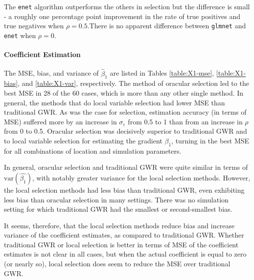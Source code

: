 \documentclass[authoryear, review, 11pt]{elsarticle}
\begin{document}
	The \verb!enet! algorithm outperforms the others in selection but the difference is small - a roughly one percentage point improvement in the rate of true positives and true negatives when $\rho = 0.5$.There is no apparent difference between {\tt glmnet} and {\tt enet} when $\rho = 0$.  
	
	
	\paragraph{Coefficient Estimation} The MSE, bias, and variance of $\hat{\beta}_1$ are listed in Tables \ref{table:X1-mse}, \ref{table:X1-bias}, and \ref{table:X1-var}, respectively. The method of oracular selection led to the best MSE in 28 of the 60 cases, which is more than any other single method. In general, the methods that do local variable selection had lower MSE than traditional GWR. As was the case for selection, estimation accuracy (in terms of MSE) suffered more by an increase in $\sigma_{\varepsilon}$ from 0.5 to 1 than from an increase in $\rho$ from 0 to 0.5. Oracular selection was decisively superior to traditional GWR and to local variable selection for estimating the gradient $\beta_1$, turning in the best MSE for all combinations of location and simulation parameters.
	
	In general, oracular selection and traditional GWR were quite similar in terms of $\text{var}\left(\hat{\beta_1}\right)$, with notably greater variance for the local selection methods. However, the local selection methods had less bias than traditional GWR, even exhibiting less bias than oracular selection in many settings. There was no simulation setting for which traditional GWR had the smallest or second-smallest bias.
	
	It seems, therefore, that the local selection methods reduce bias and increase variance of the coefficient estimates, as compared to traditional GWR. Whether traditional GWR or local selection is better in terms of MSE of the coefficient estimates is not clear in all cases, but when the actual coefficient is equal to zero (or nearly so), local selection does seem to reduce the MSE over traditional GWR.
	
\end{document}
